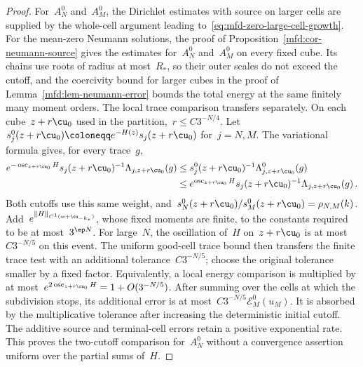\documentclass[11pt]{amsart}
\begin{document}
\begin{proof}
For~$A_N^0$ and~$A_M^0$, the Dirichlet estimates with source on larger cells are supplied by the whole-cell argument leading to~\eqref{eq:mfd-zero-large-cell-growth}. For the mean-zero Neumann solutions, the proof of Proposition~\ref{mfd:cor-neumann-source} gives the estimates for~$A_N^0$ and~$A_M^0$ on every fixed cube. Its chains use roots of radius at most~$R_*$, so their outer scales do not exceed the cutoff, and the coercivity bound for larger cubes in the proof of Lemma~\ref{mfd:lem-neumann-error} bounds the total energy at the same finitely many moment orders. The local trace comparison transfers separately. On each cube~$z+r\cu_0$ used in the partition,~$r\leq C3^{-N/4}$. Let~$s_j^0(z+r\cu_0)\coloneqq e^{-H(z)}s_j(z+r\cu_0)$ for~$j=N,M$. The variational formula gives, for every trace~$g$,
\begin{align*}
	e^{-\operatorname{osc}_{z+r\cu_0}H}s_j(z+r\cu_0)^{-1}\Lambda_{j,z+r\cu_0}(g)
	&\leq s_j^0(z+r\cu_0)^{-1}\Lambda_{j,z+r\cu_0}^0(g)
	\\ &\leq e^{\operatorname{osc}_{z+r\cu_0}H}s_j(z+r\cu_0)^{-1}\Lambda_{j,z+r\cu_0}(g)\,.
\end{align*}
Both cutoffs use this same weight, and~$s_N^0(z+r\cu_0)/s_M^0(z+r\cu_0)=\rho_{N,M}(k)$. Add~$e^{\|H\|_{C^1(w+\cu_{-k_*})}}$, whose fixed moments are finite, to the constants required to be at most~$3^{\ep N}$. For large~$N$, the oscillation of~$H$ on~$z+r\cu_0$ is at most~$C3^{-N/5}$ on this event. The uniform good-cell trace bound then transfers the finite trace test with an additional tolerance~$C3^{-N/5}$; choose the original tolerance smaller by a fixed factor. Equivalently, a local energy comparison is multiplied by at most~$e^{2\operatorname{osc}_{z+r\cu_0}H}=1+O(3^{-N/5})$. After summing over the cells at which the subdivision stops, its additional error is at most~$C3^{-N/5}\mathscr E_M^0(u_M)$. It is absorbed by the multiplicative tolerance after increasing the deterministic initial cutoff. The additive source and terminal-cell errors retain a positive exponential rate. This proves the two-cutoff comparison for~$A_N^0$ without a convergence assertion uniform over the partial sums of~$H$.
\end{proof}
\end{document}
